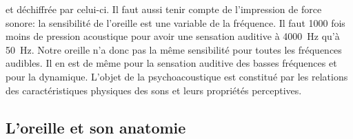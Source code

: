 	et déchiffrée par celui-ci. \autocite {futura-sciences}
Il faut aussi tenir compte de l'impression de force sonore: la sensibilité de l'oreille
est une variable de la fréquence. Il faut 1000 fois moins de pression
acoustique pour avoir une sensation auditive à \SI{4000}{\hertz} qu'à \SI{50}{\hertz}.
Notre oreille n'a donc pas la même sensibilité pour toutes
les fréquences audibles. Il en est de même pour la sensation auditive
des basses fréquences et pour la dynamique.
L'objet de la psychoacoustique est constitué par les relations des caractéristiques physiques des sons et 
leurs propriétés perceptives.




\subsection {L'oreille et son anatomie}

